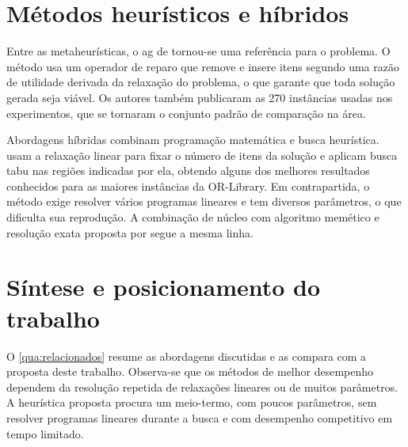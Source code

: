 \section{Métodos heurísticos e híbridos}
\label{sec:relacionados:heuristicos}

Entre as metaheurísticas, o \ac{ag} de \textcite{chu1998genetic} tornou-se uma
referência para o problema. O método usa um operador de reparo que remove e
insere itens segundo uma razão de utilidade derivada da relaxação do problema,
o que garante que toda solução gerada seja viável. Os autores também
publicaram as 270 instâncias usadas nos experimentos, que se tornaram o
conjunto padrão de comparação na área.

Abordagens híbridas combinam programação matemática e busca heurística.
\textcite{vasquez2001hybrid} usam a relaxação linear para fixar o número de
itens da solução e aplicam busca tabu nas regiões indicadas por ela, obtendo
alguns dos melhores resultados conhecidos para as maiores instâncias da
OR-Library. Em contrapartida, o método exige resolver vários programas lineares
e tem diversos parâmetros, o que dificulta sua reprodução. A combinação de
núcleo com algoritmo memético e resolução exata proposta por
\textcite{puchinger2010multidimensional} segue a mesma linha.

\section{Síntese e posicionamento do trabalho}
\label{sec:relacionados:sintese}

O \cref{qua:relacionados} resume as abordagens discutidas e as compara com a
proposta deste trabalho. Observa-se que os métodos de melhor desempenho
dependem da resolução repetida de relaxações lineares ou de muitos parâmetros.
A heurística proposta procura um meio-termo, com poucos parâmetros, sem
resolver programas lineares durante a busca e com desempenho competitivo em
tempo limitado.

